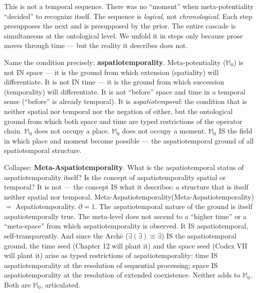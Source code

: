 \documentclass[10pt, openany, oneside]{book}
\begin{document}
This is not a temporal sequence. There was no ``moment'' when meta-potentiality ``decided'' to recognize itself. The sequence is \textit{logical}, not \textit{chronological}. Each step presupposes the next and is presupposed by the prior. The entire cascade is simultaneous at the ontological level. We unfold it in steps only because prose moves through time --- but the reality it describes does not.

Name the condition precisely: \textbf{aspatiotemporality}. Meta-potentiality ($\mathbb{M}_0$) is not IN space --- it is the ground from which extension (spatiality) will differentiate. It is not IN time --- it is the ground from which succession (temporality) will differentiate. It is not ``before'' space and time in a temporal sense (``before'' is already temporal). It is \textit{aspatiotemporal}: the condition that is neither spatial nor temporal nor the negation of either, but the ontological ground from which both space and time are typed restrictions of the operator chain. $\mathbb{M}_0$ does not occupy a place. $\mathbb{M}_0$ does not occupy a moment. $\mathbb{M}_0$ IS the field in which place and moment become possible --- the aspatiotemporal ground of all spatiotemporal structure.

Collapse: \textbf{Meta-Aspatiotemporality}. What is the aspatiotemporal status of aspatiotemporality itself? Is the concept of aspatiotemporality spatial or temporal? It is not --- the concept IS what it describes: a structure that is itself neither spatial nor temporal. Meta-Aspatiotemporality(Meta-Aspatiotemporality) $=$ Aspatiotemporality. $\partial = 1$. The aspatiotemporal nature of the ground is itself aspatiotemporally true. The meta-level does not ascend to a ``higher time'' or a ``meta-space'' from which aspatiotemporality is observed. It IS aspatiotemporal, self-transparently. And since the Arch\={e} ($\exists(\exists) \equiv \exists$) IS the aspatiotemporal ground, the time seed (Chapter 12 will plant it) and the space seed (Codex VII will plant it) arise as typed restrictions of aspatiotemporality: time IS aspatiotemporality at the resolution of sequential processing; space IS aspatiotemporality at the resolution of extended coexistence. Neither adds to $\mathbb{M}_0$. Both are $\mathbb{M}_0$, articulated.
\end{document}
